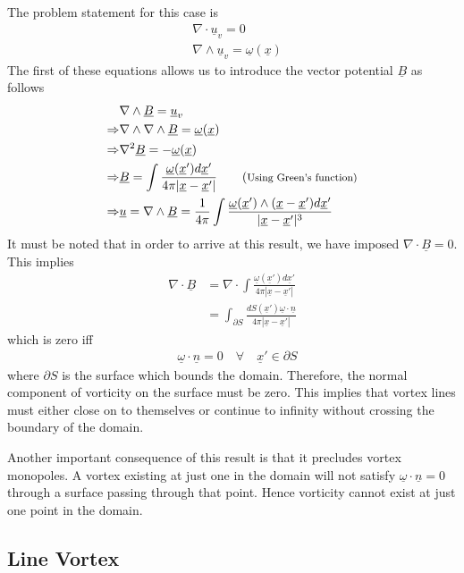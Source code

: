 \documentclass[11pt,a4paper]{article}
\newcommand{\vect}[1]{\underline{#1}}
\newcommand{\1}{\vect{1}}
\newcommand{\grad}{\nabla}
\newcommand{\curl}[1]{\nabla\wedge\vect{#1}}
\newcommand{\divg}[1]{\nabla\cdot\vect{#1}}
\newcommand{\RA}{\Rightarrow}
\newcommand{\smalltag}[1]{\tag{\footnotesize{#1}}}
\begin{document}
The problem statement for this case is
\begin{align*}
&\divg{u}_v = 0\\
&\curl{u}_v = \vect\omega(\vect x)
\end{align*}
The first of these equations allows us to introduce the vector potential $\vect B$ as follows
\begin{align*}
&\curl{B} = \vect{u}_v \\
\RA&\grad\wedge\grad\wedge\vect B = \vect\omega(\vect x)\\
\RA&\grad^2\vect B = -\vect\omega(\vect x)\\
\RA&\vect B = \int \frac{\vect\omega(\vect x') d\vect x'}{4\pi |\vect x-\vect x'|} \smalltag{Using Green's function}\\
\RA&\vect u = \curl B = \frac{1}{4\pi}\int \frac{\vect\omega(\vect x')\wedge(\vect x-\vect x') d\vect x'}{|\vect x-\vect x'|^3}
\end{align*}
It must be noted that in order to arrive at this result, we have imposed $\divg B = 0$. This implies
\begin{align*}
\divg B &= \grad\cdot\int \frac{\vect\omega(\vect x') d\vect x'}{4\pi |\vect x-\vect x'|}\\
&= \int_{\partial S} \frac{dS(\vect x') \vect \omega \cdot \vect n}{4\pi|\vect x- \vect x'|}
\end{align*} 
which is zero iff
\begin{align*}
&\vect \omega \cdot \vect n = 0 \quad \forall \quad \vect x' \in \partial S
\end{align*}
where $\partial S$ is the surface which bounds the domain. Therefore, the normal component of vorticity on the surface must be zero. This implies that vortex lines must either close on to themselves or continue to infinity without crossing the boundary of the domain.

Another important consequence of this result is that it precludes vortex monopoles. A vortex existing at just one in the domain will not satisfy $\vect\omega\cdot\vect n = 0$ through a surface passing through that point. Hence vorticity cannot exist at just one point in the domain.

\subsection{Line Vortex}
\end{document}
